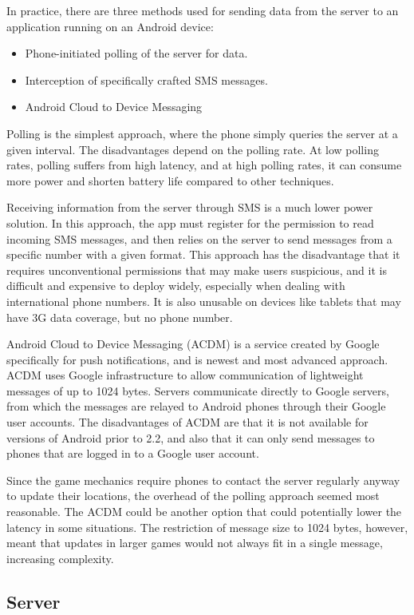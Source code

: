 \documentclass{acm_proc_article-sp}
\begin{document}
In practice, there are three methods used for sending data from the server to
an application running on an Android device:
\begin{itemize}
\item Phone-initiated polling of the server for data.
\item Interception of specifically crafted SMS messages.
\item Android Cloud to Device Messaging
\end{itemize}

Polling is the simplest approach, where the phone simply queries the server at
a given interval. The disadvantages depend on the polling rate. At low polling
rates, polling suffers from high latency, and at high polling rates, it can
consume more power and shorten battery life compared to other techniques.

Receiving information from the server through SMS is a much lower power
solution. In this approach, the app must register for the permission to read
incoming SMS messages, and then relies on the server to send messages from a
specific number with a given format. This approach has the disadvantage that it
requires unconventional permissions that may make users suspicious, and it is
difficult and expensive to deploy widely, especially when dealing with
international phone numbers. It is also unusable on devices like tablets that
may have 3G data coverage, but no phone number.

Android Cloud to Device Messaging (ACDM) is a service created by Google
specifically for push notifications, and is newest and most advanced approach.
ACDM uses Google infrastructure to allow communication of lightweight messages
of up to 1024 bytes. Servers communicate directly to Google servers, from which
the messages are relayed to Android phones through their Google user accounts.
The disadvantages of ACDM are that it is not available for versions of Android
prior to 2.2, and also that it can only send messages to phones that are logged
in to a Google user account.

Since the game mechanics require phones to contact the server regularly anyway
to update their locations, the overhead of the polling approach seemed most
reasonable. The ACDM could be another option that could potentially lower the
latency in some situations. The restriction of message size to 1024 bytes,
however, meant that updates in larger games would not always fit in a single
message, increasing complexity.


\subsection{Server}
\end{document}
